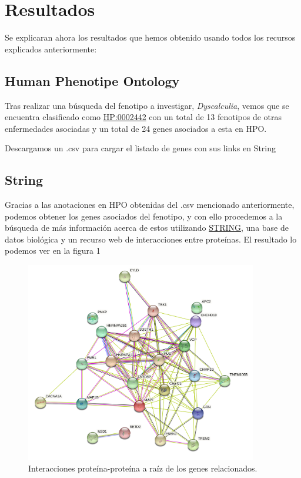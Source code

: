 

\section{Resultados}

Se explicaran ahora los resultados que hemos obtenido usando todos los recursos explicados anteriormente:

\subsection{Human Phenotipe Ontology}

\hfill

Tras realizar una búsqueda del fenotipo a investigar, \textit{Dyscalculia}, vemos que se encuentra clasificado como \href{https://hpo.jax.org/app/browse/term/HP:0002442}{HP:0002442} con un total de 13 fenotipos de otras enfermedades asociadas y un total de 24 genes asociados a esta en HPO.

Descargamos un .csv para cargar el listado de genes con sus links en String

\subsection{String}

\hfill

Gracias a las anotaciones en HPO obtenidas del .csv mencionado anteriormente, podemos obtener los genes asociados del fenotipo, y con ello procedemos a la búsqueda de más información acerca de estos utilizando \href{https://string-db.org}{STRING}, una base de datos biológica y un recurso web de interacciones entre proteínas. El resultado lo podemos ver en la figura 1

\begin{figure}[h]
	\centering
	\includegraphics[width=0.90\textwidth]{figures/Gene_Relationship.png}
	\caption{Interacciones proteína-proteína a raíz de los genes relacionados. }
	\label{fig:string1}
\end{figure}

